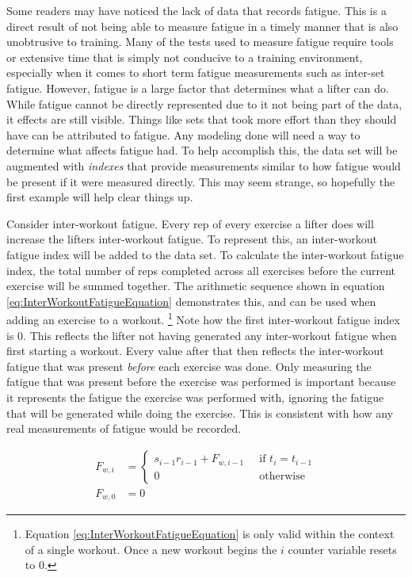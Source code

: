 Some readers may have noticed the lack of data that records fatigue. This is a direct result of not being able to measure fatigue in a timely manner that is also unobtrusive to training. Many of the tests used to measure fatigue require tools or extensive time that is simply not conducive to a training environment, especially when it comes to short term fatigue measurements such as inter-set fatigue. However, fatigue is a large factor that determines what a lifter can do. While fatigue cannot be directly represented due to it not being part of the data, it effects are still visible. Things like sets that took more effort than they should have can be attributed to fatigue. Any modeling done will need a way to determine what affects fatigue had. To help accomplish this, the data set will be augmented with \textit{indexes} that provide measurements similar to how fatigue would be present if it were measured directly. This may seem strange, so hopefully the first example will help clear things up.

Consider inter-workout fatigue. Every rep of every exercise a lifter does will increase the lifters inter-workout fatigue. To represent this, an inter-workout fatigue index will be added to the data set. To calculate the inter-workout fatigue index, the total number of reps completed across all exercises before the current exercise will be summed together. The arithmetic sequence shown in equation \ref{eq:InterWorkoutFatigueEquation} demonstrates this, and can be used when adding an exercise to a workout. \footnote{Equation \ref{eq:InterWorkoutFatigueEquation} is only valid within the context of a single workout. Once a new workout begins the $i$ counter variable resets to $0$.} Note how the first inter-workout fatigue index is $0$. This reflects the lifter not having generated any inter-workout fatigue when first starting a workout. Every value after that then reflects the inter-workout fatigue that was present \textit{before} each exercise was done. Only measuring the fatigue that was present before the exercise was performed is important because it represents the fatigue the exercise was performed with, ignoring the fatigue that will be generated while doing the exercise. This is consistent with how any real measurements of fatigue would be recorded.

\begin{equation}
	\label{eq:InterWorkoutFatigueEquation}
	\begin{split}
		F_{w,i} & = 
		\begin{cases}
			s_{i-1}r_{i-1}+F_{w,i-1} \;\; & \text{if }t_i=t_{i-1} \\
			0 \;\; & \text{otherwise}
		\end{cases}
		\\
		F_{w,0} & = 0
	\end{split}
\end{equation}

